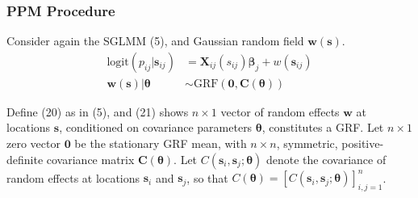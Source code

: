 \subsubsection{PPM Procedure}

Consider again the SGLMM (5), and Gaussian random field $\pmb{w}(\pmb{s})$.
\begin{align}
\text{logit}(p_{ij}|\pmb{s}_{ij}) &= \pmb{X}_{ij}(s_{ij}) \pmb{\beta}_{j} + w(\pmb{s}_{ij}) \\
\pmb{w}(\pmb{s}) | \pmb{\theta} &\sim \text{GRF}(\pmb{0}, \pmb{C}(\pmb{\theta}))
\end{align}

Define (20) as in (5), and (21) shows $n \times 1$ vector of random effects $\pmb{w}$ at locations $\pmb{s}$, conditioned on covariance parameters $\pmb{\theta}$, constitutes a GRF. Let $n \times 1$ zero vector $\pmb{0}$ be the stationary GRF mean, with $n \times n$, symmetric, positive-definite covariance matrix $\pmb{C}(\pmb{\theta})$. Let $C(\pmb{s}_{i}, \pmb{s}_{j}; \pmb{\theta})$ denote the covariance of random effects at locations $\pmb{s}_{i}$ and $\pmb{s}_{j}$, so that $C(\pmb{\theta}) = [C(\pmb{s}_{i}, \pmb{s}_{j}; \pmb{\theta})]_{i,j=1}^{n}$.

